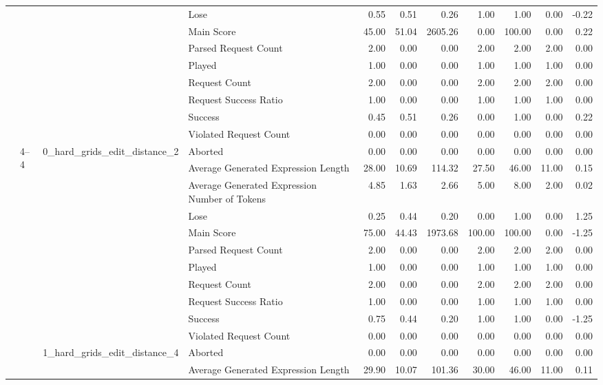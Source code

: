 \begin{tabular}{llllrrrrrrr}
 &  &  & Lose & 0.55 & 0.51 & 0.26 & 1.00 & 1.00 & 0.00 & -0.22 \\
 &  &  & Main Score & 45.00 & 51.04 & 2605.26 & 0.00 & 100.00 & 0.00 & 0.22 \\
 &  &  & Parsed Request Count & 2.00 & 0.00 & 0.00 & 2.00 & 2.00 & 2.00 & 0.00 \\
 &  &  & Played & 1.00 & 0.00 & 0.00 & 1.00 & 1.00 & 1.00 & 0.00 \\
 &  &  & Request Count & 2.00 & 0.00 & 0.00 & 2.00 & 2.00 & 2.00 & 0.00 \\
 &  &  & Request Success Ratio & 1.00 & 0.00 & 0.00 & 1.00 & 1.00 & 1.00 & 0.00 \\
 &  &  & Success & 0.45 & 0.51 & 0.26 & 0.00 & 1.00 & 0.00 & 0.22 \\
 &  &  & Violated Request Count & 0.00 & 0.00 & 0.00 & 0.00 & 0.00 & 0.00 & 0.00 \\
\cline{2-11} \cline{3-11}
 & \multirow[t]{22}{*}{4--4} & \multirow[t]{11}{*}{0_hard_grids_edit_distance_2} & Aborted & 0.00 & 0.00 & 0.00 & 0.00 & 0.00 & 0.00 & 0.00 \\
 &  &  & Average Generated Expression Length & 28.00 & 10.69 & 114.32 & 27.50 & 46.00 & 11.00 & 0.15 \\
 &  &  & Average Generated Expression Number of Tokens & 4.85 & 1.63 & 2.66 & 5.00 & 8.00 & 2.00 & 0.02 \\
 &  &  & Lose & 0.25 & 0.44 & 0.20 & 0.00 & 1.00 & 0.00 & 1.25 \\
 &  &  & Main Score & 75.00 & 44.43 & 1973.68 & 100.00 & 100.00 & 0.00 & -1.25 \\
 &  &  & Parsed Request Count & 2.00 & 0.00 & 0.00 & 2.00 & 2.00 & 2.00 & 0.00 \\
 &  &  & Played & 1.00 & 0.00 & 0.00 & 1.00 & 1.00 & 1.00 & 0.00 \\
 &  &  & Request Count & 2.00 & 0.00 & 0.00 & 2.00 & 2.00 & 2.00 & 0.00 \\
 &  &  & Request Success Ratio & 1.00 & 0.00 & 0.00 & 1.00 & 1.00 & 1.00 & 0.00 \\
 &  &  & Success & 0.75 & 0.44 & 0.20 & 1.00 & 1.00 & 0.00 & -1.25 \\
 &  &  & Violated Request Count & 0.00 & 0.00 & 0.00 & 0.00 & 0.00 & 0.00 & 0.00 \\
\cline{3-11}
 &  & \multirow[t]{11}{*}{1_hard_grids_edit_distance_4} & Aborted & 0.00 & 0.00 & 0.00 & 0.00 & 0.00 & 0.00 & 0.00 \\
 &  &  & Average Generated Expression Length & 29.90 & 10.07 & 101.36 & 30.00 & 46.00 & 11.00 & 0.11 \\

\end{tabular}
